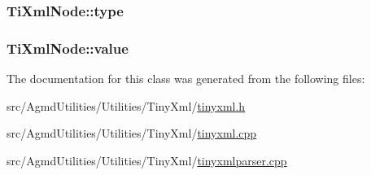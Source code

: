 \hypertarget{class_ti_xml_node_a2619c6379181c16ba95ae6922e2ca839}{
\subsubsection[{type}]{ Ti\+Xml\+Node\+::type\hspace{0.3cm}{\ttfamily [protected]}}}\label{class_ti_xml_node_a2619c6379181c16ba95ae6922e2ca839}
\hypertarget{class_ti_xml_node_aead528b3cedc33c16a6c539872c7cc8b}{
\subsubsection[{value}]{ Ti\+Xml\+Node\+::value\hspace{0.3cm}{\ttfamily [protected]}}}\label{class_ti_xml_node_aead528b3cedc33c16a6c539872c7cc8b}


The documentation for this class was generated from the following files\+:\begin{DoxyCompactItemize}
\item 
src/\+Agmd\+Utilities/\+Utilities/\+Tiny\+Xml/\hyperlink{tinyxml_8h}{tinyxml.\+h}\item 
src/\+Agmd\+Utilities/\+Utilities/\+Tiny\+Xml/\hyperlink{tinyxml_8cpp}{tinyxml.\+cpp}\item 
src/\+Agmd\+Utilities/\+Utilities/\+Tiny\+Xml/\hyperlink{tinyxmlparser_8cpp}{tinyxmlparser.\+cpp}\end{DoxyCompactItemize}
